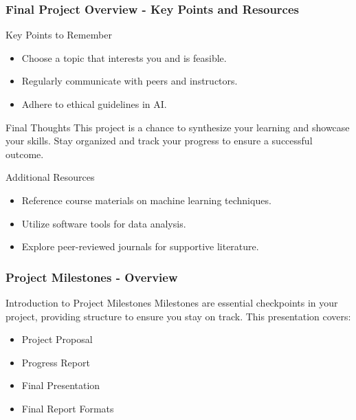 \documentclass[aspectratio=169]{beamer}
\begin{document}
\begin{frame}[fragile]
    \frametitle{Final Project Overview - Key Points and Resources}
    \begin{block}{Key Points to Remember}
        \begin{itemize}
            \item Choose a topic that interests you and is feasible.
            \item Regularly communicate with peers and instructors.
            \item Adhere to ethical guidelines in AI.
        \end{itemize}
    \end{block}
    
    \begin{block}{Final Thoughts}
        This project is a chance to synthesize your learning and showcase your skills. Stay organized and track your progress to ensure a successful outcome.
    \end{block}
    
    \begin{block}{Additional Resources}
        \begin{itemize}
            \item Reference course materials on machine learning techniques.
            \item Utilize software tools for data analysis.
            \item Explore peer-reviewed journals for supportive literature.
        \end{itemize}
    \end{block}
\end{frame}

\begin{frame}[fragile]
    \frametitle{Project Milestones - Overview}
    \begin{block}{Introduction to Project Milestones}
        Milestones are essential checkpoints in your project, providing structure to ensure you stay on track. This presentation covers:
    \end{block}
    \begin{itemize}
        \item Project Proposal
        \item Progress Report
        \item Final Presentation
        \item Final Report Formats
    \end{itemize}
\end{frame}
\end{document}
